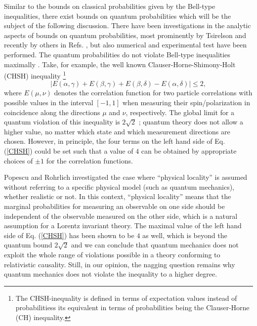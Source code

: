 \documentclass[pra,amsmath,amsfonts,showkeys,showpacs,preprint]{revtex4}
\begin{document}
Similar to the bounds on classical probabilities given by the
Bell-type inequalities, there exist bounds
on quantum probabilities which will be the subject of the following
discussion.
There have been investigations in the analytic aspects of bounds on
quantum probabilities, most prominently by
Tsirelson \cite{tsirelson80,khalfin92} and recently by others in Refs. \cite{pitowsky01a, masanes03, cabello04, filipp-svozil04a}, but also numerical
\cite{filipp-svozil04} and experimental \cite{bovino04} test have been
performed.
The quantum
probabilities do not
violate Bell-type inequalities maximally
\cite{popescu92,mermin95,krenn-svozil98}.
Take, for example, the well known Clauser-Horne-Shimony-Holt (CHSH)
inequality
\footnote{The CHSH-inequality is defined in terms of
  expectation values instead of probabilitiess its equivalent in terms
  of probabilities being the
  Clauser-Horne (CH) inequality.}
\begin{equation}
\label{CHSH}
|E(\alpha,\gamma)+E(\beta,\gamma)+E(\beta,\delta)-E(\alpha,\delta)|\leq 2,
\end{equation}
where $E(\mu,\nu)$ denotes the correlation function for two particle
correlations with possible values in the interval $[-1,1]$ when measuring their spin/polarization in coincidence
along the directions $\mu$ and $\nu$, respectively. The global limit
for a quantum
violation of this inequality is $2\sqrt{2}$ \cite{tsirelson80,landau87};
quantum theory does not allow a higher value, no
matter which state and which measurement directions are chosen.
However, in principle, the four terms on the left hand
side of Eq. (\ref{CHSH})
could be set such that a value of $4$ can be obtained by appropriate
choices of $\pm 1$ for the correlation functions.

Popescu and Rohrlich \cite{popescu92} investigated the case
where  ``physical locality'' is assumed without referring to a
specific physical model (such as quantum mechanics), whether realistic or
not.
In this context, ``physical locality'' means that the
marginal probabilities for measuring an observable on one side should
be independent of the
observable measured on the other side, which is a natural assumption
for a Lorentz invariant theory. The  maximal value
of the left hand side of Eq. (\ref{CHSH}) has been shown to be $4$ as well, which is beyond the
quantum bound $2\sqrt{2}$ and we can conclude that quantum mechanics
does not exploit the whole range of violations possible in a theory
conforming to relativistic causality.
Still, in our opinion, the nagging question remains why
quantum mechanics does not violate the inequality to a higher
degree.
\end{document}
